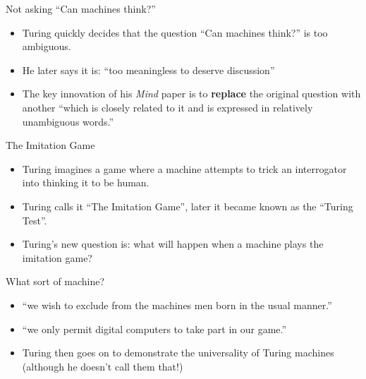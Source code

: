 \documentclass[10pt]{beamer}
\begin{document}
\begin{titledslide}{Not asking ``Can machines think?''}

  \begin{itemize}
  \item Turing quickly decides that the question ``Can machines
    think?'' is too ambiguous.
  \item He later says it is: ``too meaningless to deserve discussion''
  \item The key innovation of his \emph{Mind} paper is to
    \textbf{replace} the original question with another ``which is
    closely related to it and is expressed in relatively unambiguous
    words.''
  \end{itemize}
  
\end{titledslide}
\begin{titledslide}{The Imitation Game}

  \begin{itemize}
  \item Turing imagines a game where a machine attempts to trick an
    interrogator into thinking it to be human.
  \item Turing calls it ``The Imitation Game'', later it became known
    as the ``Turing Test''.
  \item Turing's new question is: what will happen when a machine
    plays the imitation game?
  \end{itemize}
  
\end{titledslide}
\begin{titledslide}{What sort of machine?}

  \begin{itemize}
  \item ``we wish to exclude from the machines men born in the usual
    manner.''
  \item ``we only permit digital computers to take part in our game.''
  \item Turing then goes on to demonstrate the universality of Turing
    machines (although he doesn't call them that!)
  \end{itemize}
  
\end{titledslide}
\end{document}
